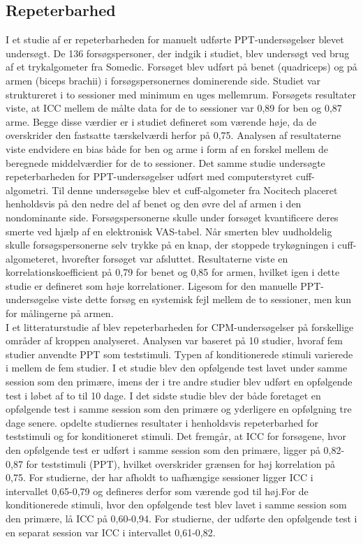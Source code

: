 \subsection{Repeterbarhed}
I et studie af  er repeterbarheden for manuelt udførte PPT-undersøgelser blevet undersøgt. De 136 forsøgspersoner, der indgik i studiet, blev undersøgt ved brug af et trykalgometer fra Somedic.  Forsøget blev udført på benet (quadriceps) og på armen (biceps brachii) i forsøgspersonernes dominerende side. Studiet var struktureret i to sessioner med minimum en uges mellemrum. Forsøgets resultater viste, at ICC mellem de målte data for de to sessioner var 0,89 for ben og 0,87 arme. Begge disse værdier er i studiet defineret som værende høje, da de overskrider den fastsatte tærskelværdi herfor på 0,75. Analysen af resultaterne viste endvidere en bias både for ben og arme i form af en forskel mellem de beregnede middelværdier for de to sessioner. Det samme studie undersøgte repeterbarheden for PPT-undersøgelser udført med computerstyret cuff-algometri. Til denne undersøgelse blev et cuff-algometer fra Nocitech placeret henholdsvis på den nedre del af benet og den øvre del af armen i den nondominante side. Forsøgspersonerne skulle under forsøget kvantificere deres smerte ved hjælp af en elektronisk VAS-tabel. Når smerten blev uudholdelig skulle forsøgspersonerne selv trykke på en knap, der stoppede trykøgningen i cuff-algometeret, hvorefter forsøget var afsluttet. Resultaterne viste en korrelationskoefficient på 0,79 for benet og 0,85 for armen, hvilket igen i dette studie er defineret som høje korrelationer. Ligesom for den manuelle PPT-undersøgelse viste dette forsøg en systemisk fejl mellem de to sessioner, men kun for målingerne på armen.\\
I et litteraturstudie af  blev repeterbarheden for CPM-undersøgelser på forskellige områder af kroppen analyseret. Analysen var baseret på 10 studier, hvoraf fem studier anvendte PPT som teststimuli. Typen af konditionerede stimuli varierede i mellem de fem studier. I et studie blev den opfølgende test lavet under samme session som den primære, imens der i tre andre studier blev udført en opfølgende test i løbet af to til 10 dage. I det sidste studie blev der både foretaget en opfølgende test i samme session som den primære og yderligere en opfølgning tre dage senere.  opdelte studiernes resultater i henholdsvis repeterbarhed for teststimuli og for konditioneret stimuli. Det fremgår, at ICC for forsøgene, hvor den opfølgende test er udført i samme session som den primære, ligger på 0,82-0,87 for teststimuli (PPT), hvilket overskrider grænsen for høj korrelation på 0,75. For studierne, der har afholdt to uafhængige sessioner ligger ICC i intervallet 0,65-0,79 og defineres derfor som værende god til høj.For de konditionerede stimuli, hvor den opfølgende test blev lavet i samme session som den primære, lå ICC på 0,60-0,94. For studierne, der udførte den opfølgende test i en separat session var ICC i intervallet 0,61-0,82.\\ 
